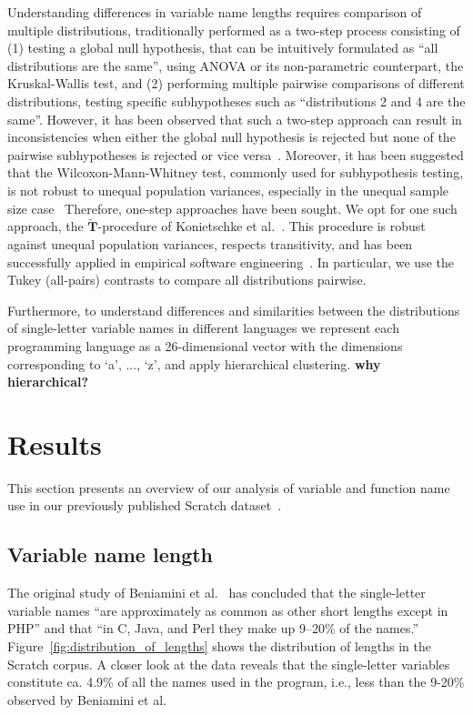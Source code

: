 \documentclass[conference]{IEEEtran}
\newcommand{\todo}[1]{ \textbf{#1} }
\begin{document}
Understanding differences in variable name lengths requires comparison of multiple distributions, traditionally performed as a two-step process consisting of (1) testing a global null hypothesis, that can be intuitively formulated as ``all distributions are the same'', using ANOVA or its non-parametric counterpart, the Kruskal-Wallis test, and (2) performing multiple pairwise comparisons of different distributions, testing specific subhypotheses such as ``distributions 2 and 4 are the same''. 
However, it has been observed that such a two-step approach can result in inconsistencies when either the global null hypothesis is rejected but none of the pairwise subhypotheses is rejected or vice versa~\cite{Gabriel}. 
Moreover, it has been suggested that the Wilcoxon-Mann-Whitney test, commonly used for subhypothesis testing, is not robust to unequal population variances, especially in the unequal sample size case~\cite{Zimmerman:Zumbo}
Therefore, one-step approaches have been sought.
We opt for one such approach, the $\widetilde{\mathbf{T}}$-procedure of Konietschke et al.~\cite{Konietschke:Hothorn:Brunner}. 
This procedure is robust against unequal population variances, respects transitivity, and has been successfully applied in empirical software engineering~\cite{VasilescuSGM14,VasilescuCS14,YuWYW16}.
In particular, we use the Tukey (all-pairs) contrasts to compare all distributions pairwise.

Furthermore, to understand differences and similarities between the distributions of single-letter variable names in different languages we represent each programming language as a 26-dimensional vector with the dimensions corresponding to `a', ..., `z', and apply hierarchical clustering. \todo{why hierarchical?}

 \section{Results}
This section presents an overview of our analysis of variable and function name use in our previously published Scratch dataset~\cite{Aivaloglou2016HowKC}.

\subsection{Variable name length}
The original study of Beniamini et al.~\cite{Beniamini} has concluded that the single-letter variable names ``are approximately as common as other short lengths except in PHP'' and that  ``in C, Java, and Perl they make up 9–20\% of the names.'' 
Figure~\ref{fig:distribution_of_lengths} shows the distribution of lengths in the Scratch corpus. A closer look at the data reveals that the single-letter variables constitute ca. 4.9\% of all the names used in the program, i.e., less than the 9-20\% observed by Beniamini et al.
\end{document}
